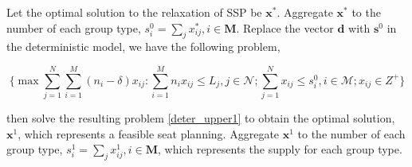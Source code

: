 



Let the optimal solution to the relaxation of SSP be $\mathbf{x}^{*}$. Aggregate $\mathbf{x}^{*}$ to the number of each group type, ${s}_{i}^{0} =\sum_{j} x^{*}_{ij}, i \in \mathbf{M}$. Replace the vector $\mathbf{d}$ with $\mathbf{s}^{0}$ in the deterministic model, we have the following problem, 

\begin{equation}\label{deter_upper1}
  \{\max \sum_{j=1}^{N} \sum_{i=1}^{M}(n_i -\delta) x_{ij}: \sum_{i = 1}^{M} n_i x_{ij} \leq L_{j}, j \in \mathcal{N}; \sum_{j =1}^{N} x_{ij} \leq s_{i}^{0}, i \in \mathcal{M}; x_{ij} \in Z^{+} \}
\end{equation}

then solve the resulting problem \eqref{deter_upper1} to obtain the optimal solution, $\mathbf{x}^{1}$, which represents a feasible seat planning. Aggregate $\mathbf{x}^{1}$ to the number of each group type, ${s}_{i}^{1} = \sum_{j} x^{1}_{ij}, i \in \mathbf{M}$, which represents the supply for each group type.


